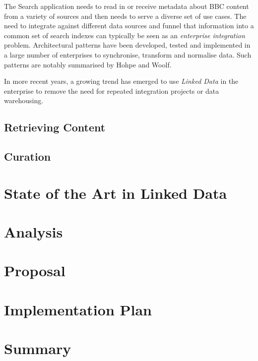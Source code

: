 \documentclass[10pt,a4paper]{report}
\begin{document}
The Search application needs to read in or receive metadata about
BBC content from a variety of sources and then needs to serve
a diverse set of use cases. \cite{fenning2014applicability} The
need to integrate against different data sources and funnel
that information into a common set of search indexes can
typically be seen as an \emph{enterprise integration}
problem. Architectural patterns have been developed, tested and
implemented in a large number of enterprises to synchronise,
transform and normalise data. Such patterns are notably
summarised by Hohpe and Woolf\cite{hohpe2004enterprise}.

In more recent years, a growing trend has emerged to use
\emph{Linked Data} in the enterprise to remove the need
for repeated integration projects or data warehousing.
\cite{allemang2010semantic}

\section{Retrieving Content}

\section{Curation}

\chapter{State of the Art in Linked Data}

\chapter{Analysis}

\chapter{Proposal}

\chapter{Implementation Plan}

\chapter{Summary}



\end{document}
